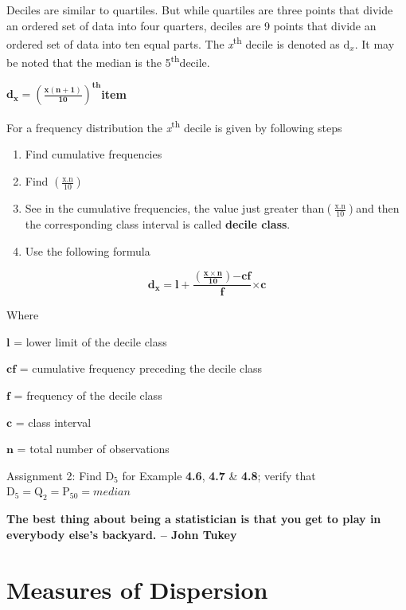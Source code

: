 \documentclass[
]{book}
\begin{document}
Deciles are similar to quartiles. But while quartiles are three points
that divide an ordered set of data into four quarters, deciles are 9
points that divide an ordered set of data into ten equal parts. The
\emph{x}\textsuperscript{th} decile is denoted as\(\text{\ d}_{x}\). It may be noted that the
median is the 5\textsuperscript{th}decile.

\(\mathbf{d}_{\mathbf{x}}\mathbf{=}\left( \frac{\mathbf{x}\left( \mathbf{n + 1} \right)}{\mathbf{10}} \right)^{\mathbf{\text{th}}}\)\textbf{item}

For a frequency distribution the \emph{x}\textsuperscript{th} decile is given by following
steps

\begin{enumerate}
\def\labelenumi{\arabic{enumi}.}
\item
  Find cumulative frequencies
\item
  Find \(\left( \frac{\text{x.n}}{10} \right)\)
\item
  See in the cumulative frequencies, the value just greater
  than\(\left( \frac{\text{x.n}}{10} \right)\)and then the corresponding
  class interval is called \textbf{decile class}.
\item
  Use the following formula
\end{enumerate}

\[\mathbf{d}_{\mathbf{x}}\mathbf{= l +}\frac{\left( \frac{\mathbf{x \times n}}{\mathbf{10}} \right)\mathbf{- cf}}{\mathbf{f}}\mathbf{\times c}\]

Where

\(\mathbf{l}\) = lower limit of the decile class

\(\mathbf{\text{cf}}\) = cumulative frequency preceding the decile class

\(\mathbf{f}\) = frequency of the decile class

\(\mathbf{c}\) = class interval

\(\mathbf{n}\) = total number of observations

\begin{rmdnote}
Assignment 2: Find \(\text{D}_{5}\) for Example \textbf{4.6}, \textbf{4.7} \&
\textbf{4.8}; verify that
\(\text{D}_{5} = \text{Q}_{2} = \text{P}_{50} = median\)
\end{rmdnote}

\hypertarget{hello}{}
\textbf{The best thing about being a statistician is that you get to play in everybody else's backyard.
-- John Tukey}

\hypertarget{measures-of-dispersion}{%
\chapter{Measures of Dispersion}\label{measures-of-dispersion}}
\end{document}

